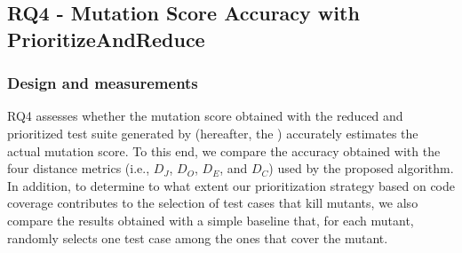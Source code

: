 %

%
%
%


\subsection{RQ4 - Mutation Score Accuracy with PrioritizeAndReduce}
\label{exp:accuracy:prioritize}

\subsubsection{Design and measurements}

RQ4 assesses whether the mutation score obtained with the reduced and prioritized test suite generated by \APPR (hereafter, the \MPTS) accurately estimates the actual mutation  score.
To this end, we compare the accuracy obtained with the four distance metrics (i.e., $D_J$, $D_O$, $D_E$, and $D_C$) used by the proposed  algorithm. In addition, to determine to what extent our prioritization strategy based on code coverage contributes to the selection of test cases that kill mutants, we also compare the results obtained with a simple baseline that, for each mutant, randomly selects one test case among the ones that cover the mutant.


